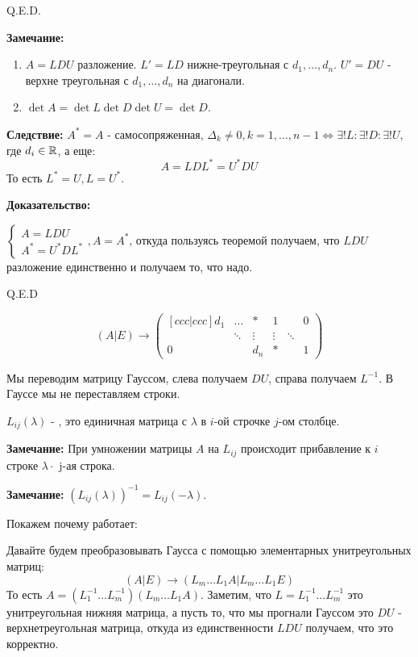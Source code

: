     \hfill Q.E.D.


\textbf{Замечание:}
\begin{enumerate}
    \item $A = LDU$ разложение. $L' =LD$ нижне-треугольная с $d_1,\ldots,d_n$. $U' = DU$ - верхне треугольная с $d_1,\ldots,d_n$ на диагонали.
    \item $\det A = \det L \det D  \det U = \det D$.

\end{enumerate}

\textbf{Следствие:} $A^* = A$  - самосопряженная, $\Delta_k \neq 0 , k = 1, \ldots, n-1 \Leftrightarrow \exists ! L : \exists! D : \exists! U$, где $d_i\in \mathbb{R}$, а еще:
$$A = LDL^* = U^*DU$$
То есть $L^* = U, L = U^*$.

\textbf{Доказательство:}

$\begin{cases}
    A = LDU\\
    A^* = U^*DL^*
\end{cases}, A = A^*$, откуда пользуясь теоремой получаем, что $LDU$ разложение единственно и получаем то, что надо.

\hfill Q.E.D


$$(A | E) \rightarrow{} \begin{pmatrix}[ccc|ccc]
    d_1 & \ldots & * & 1 &        & 0\\
     & \ddots &\vdots &  \vdots  &\ddots & \\
     0 & & d_n   & * & &1
\end{pmatrix}$$

Мы переводим матрицу Гауссом, слева получаем $DU$, справа получаем $L^{-1}$. В Гауссе мы не переставляем строки.

 $L_{ij}(\lambda)$ - , это единичная матрица с $\lambda$ в $i$-ой строчке $j$-ом столбце.

\textbf{Замечание:} При умножении матрицы $A$ на $L_{ij}$ происходит прибавление к $i$ строке $\lambda \cdot$ j-ая строка.

\textbf{Замечание:} $(L_{ij}(\lambda))^{-1} = L_{ij}(-\lambda)$.

Покажем почему работает:

Давайте будем преобразовывать Гаусса с помощью элементарных унитреугольных матриц:
$$(A|E) \rightarrow{} (L_m\ldots L_1 A | L_m\ldots L_1 E)$$
То есть $A = (L_1^{-1}\ldots L_{m}^{-1})(L_m\ldots L_1A)$. Заметим, что $L= L_{1}^{-1}\ldots L_m^{-1}$ это унитреугольная нижняя матрица, а пусть то, что мы прогнали Гауссом это $DU$ - верхнетреугольная матрица, откуда из единственности $LDU$ получаем, что это корректно.




